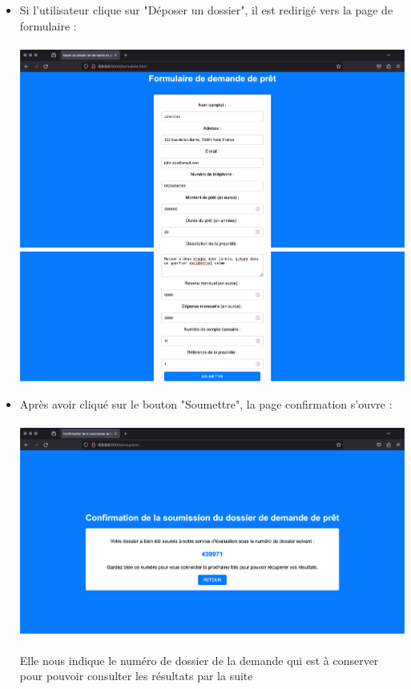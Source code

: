 \documentclass{article}
\begin{document}
   \newpage
   \begin{itemize}

		
		\item Si l'utilisateur clique sur "Déposer un dossier", il est redirigé vers la page de formulaire : \\
		\\
		\includegraphics[width=\textwidth]{images/formulairea1.png} \\
		\includegraphics[width=\textwidth]{images/formulairea2.png}
		
		\item Après avoir cliqué sur le bouton "Soumettre", la page confirmation s’ouvre : \\ 
		\\
		\includegraphics[width=\textwidth]{images/depota.png} \\
		\\
		Elle nous indique le numéro de dossier de la demande qui est à conserver pour pouvoir consulter les résultats par la suite
		

\end{itemize}
\end{document}
